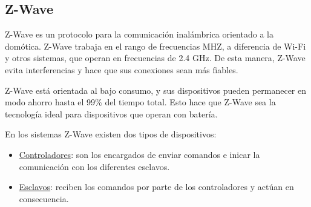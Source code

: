 \subsection{Z-Wave}

Z-Wave es un protocolo para la comunicación inalámbrica orientado a la domótica. Z-Wave trabaja en el rango de frecuencias MHZ, a diferencia de Wi-Fi 
y otros sistemas, que operan en frecuencias de 2.4 GHz. De esta manera, Z-Wave evita interferencias y hace que sus conexiones sean más fiables.
\par
Z-Wave está orientada al bajo consumo, y sus dispositivos pueden permanecer en modo ahorro hasta el 99\% del tiempo total. Esto hace que Z-Wave sea 
la tecnología ideal para dispositivos que operan con batería.
\par
En los sistemas Z-Wave existen dos tipos de dispositivos:
\begin{itemize}
\item\underline{Controladores}: son los encargados de enviar comandos e inicar la comunicación con los diferentes esclavos.
\item\underline{Esclavos}: reciben los comandos por parte de los controladores y actúan en consecuencia.
\end{itemize}